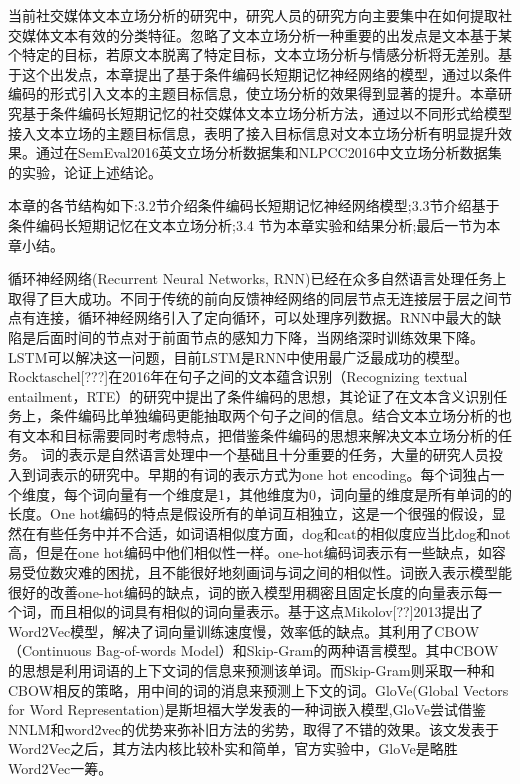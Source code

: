 

当前社交媒体文本立场分析的研究中，研究人员的研究方向主要集中在如何提取社交媒体文本有效的分类特征。忽略了文本立场分析一种重要的出发点是文本基于某个特定的目标，若原文本脱离了特定目标，文本立场分析与情感分析将无差别。基于这个出发点，本章提出了基于条件编码长短期记忆神经网络的模型，通过以条件编码的形式引入文本的主题目标信息，使立场分析的效果得到显著的提升。本章研究基于条件编码长短期记忆的社交媒体文本立场分析方法，通过以不同形式给模型接入文本立场的主题目标信息，表明了接入目标信息对文本立场分析有明显提升效果。通过在SemEval2016英文立场分析数据集和NLPCC2016中文立场分析数据集的实验，论证上述结论。

本章的各节结构如下:3.2节介绍条件编码长短期记忆神经网络模型;3.3节介绍基于条件编码长短期记忆在文本立场分析;3.4 节为本章实验和结果分析;最后一节为本章小结。

循环神经网络(Recurrent Neural Networks, RNN)已经在众多自然语言处理任务上取得了巨大成功。不同于传统的前向反馈神经网络的同层节点无连接层于层之间节点有连接，循环神经网络引入了定向循环，可以处理序列数据。RNN中最大的缺陷是后面时间的节点对于前面节点的感知力下降，当网络深时训练效果下降。LSTM可以解决这一问题，目前LSTM是RNN中使用最广泛最成功的模型。Rocktaschel[???]在2016年在句子之间的文本蕴含识别（Recognizing textual entailment，RTE）的研究中提出了条件编码的思想，其论证了在文本含义识别任务上，条件编码比单独编码更能抽取两个句子之间的信息。结合文本立场分析的也有文本和目标需要同时考虑特点，把借鉴条件编码的思想来解决文本立场分析的任务。
词的表示是自然语言处理中一个基础且十分重要的任务，大量的研究人员投入到词表示的研究中。早期的有词的表示方式为one hot encoding。每个词独占一个维度，每个词向量有一个维度是1，其他维度为0，词向量的维度是所有单词的的长度。One hot编码的特点是假设所有的单词互相独立，这是一个很强的假设，显然在有些任务中并不合适，如词语相似度方面，dog和cat的相似度应当比dog和not高，但是在one hot编码中他们相似性一样。one-hot编码词表示有一些缺点，如容易受位数灾难的困扰，且不能很好地刻画词与词之间的相似性。词嵌入表示模型能很好的改善one-hot编码的缺点，词的嵌入模型用稠密且固定长度的向量表示每一个词，而且相似的词具有相似的词向量表示。基于这点Mikolov[??]2013提出了Word2Vec模型，解决了词向量训练速度慢，效率低的缺点。其利用了CBOW（Continuous Bag-of-words Model）和Skip-Gram的两种语言模型。其中CBOW的思想是利用词语的上下文词的信息来预测该单词。而Skip-Gram则采取一种和CBOW相反的策略，用中间的词的消息来预测上下文的词。GloVe(Global Vectors for Word Representation)是斯坦福大学发表的一种词嵌入模型,GloVe尝试借鉴NNLM和word2vec的优势来弥补旧方法的劣势，取得了不错的效果。该文发表于Word2Vec之后，其方法内核比较朴实和简单，官方实验中，GloVe是略胜Word2Vec一筹。

